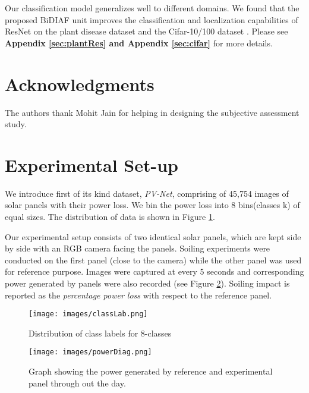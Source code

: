 \documentclass[10pt,twocolumn,letterpaper]{article}
\begin{document}
Our classification model generalizes well to different domains. We found that the proposed BiDIAF unit improves the classification and localization capabilities of ResNet on the plant disease dataset \cite{sladojevic2016deep} and the Cifar-10/100 dataset \cite{krizhevsky2009learning}. Please see \textbf{Appendix \ref{sec:plantRes} and Appendix \ref{sec:cifar}} for more details.

\vspace{-2mm}
\section*{Acknowledgments}
\vspace{-2mm}
The authors thank Mohit Jain for helping in designing the subjective assessment study. %

{\small
%


}

\clearpage

\appendix

\section{Experimental Set-up}
\label{sec:setup}
We introduce first of its kind dataset, \textit{PV-Net}, comprising of 45,754 images of solar panels with their power loss. We bin the power loss into 8 bins(classes k) of equal sizes. The distribution of data is shown in Figure \ref{fig:distribution}.

Our experimental setup consists of two identical solar panels, which are kept side by side with an RGB camera facing the panels. Soiling experiments were conducted on the first panel (close to the camera) while the other panel was used for reference purpose. Images were captured at every 5 seconds and corresponding power generated by panels were also recorded (see Figure \ref{fig:powerGen}). Soiling impact is reported as the \textit{percentage power loss} with respect to the reference panel. 
\begin{figure}[b!]
	\centering
	\texttt{[image: images/classLab.png]}
	\caption{Distribution of class labels for 8-classes}
	\label{fig:distribution}
\end{figure}

\begin{figure}[b!]
	\centering
	\texttt{[image: images/powerDiag.png]}
	\caption{Graph showing the power generated by reference and experimental panel through out the day.}
	\label{fig:powerGen}
\end{figure}
\end{document}
